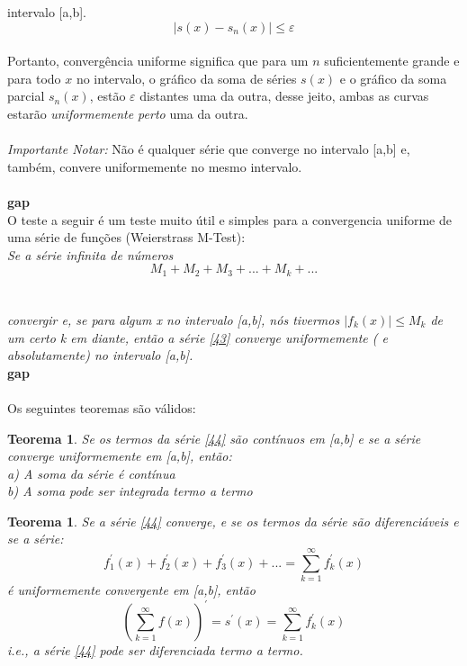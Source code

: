 intervalo [a,b].\\
\begin{equation}
    |s(x) - s_n(x)| \leq \varepsilon
\end{equation}
\\
Portanto, convergência uniforme significa que para um $n$ suficientemente 
grande e para todo $x$ no intervalo, o gráfico da soma de séries $s(x)$ e o 
gráfico da soma parcial $s_n(x)$, estão $\varepsilon$ distantes uma da outra,
desse jeito, ambas as curvas estarão \textit{uniformemente perto} uma da outra.\\
\\
\textit{Importante Notar:}
Não é qualquer série que converge no intervalo [a,b] e, também, convere uniformemente
no mesmo intervalo.\\
\\
\textbf{gap} 
\\
O teste a seguir é um teste muito útil e simples para a convergencia uniforme
de uma série de funções (Weierstrass M-Test):\\
\textit{
    Se a série infinita de números \\
    \begin{equation}
        M_1 + M_2 + M_3 + ... + M_k + ...
    \end{equation}
    \\
    \\
    convergir e, se para algum x no intervalo [a,b], nós tivermos $|f_k(x)| \leq M_k$
    de um certo k em diante, então a série \ref{43} converge uniformemente ( e 
    absolutamente) no intervalo [a,b].
} 
\\
\textbf{gap}\\
\\
Os seguintes teoremas são válidos:

\newtheorem{teo1}{Teorema}
\begin{teo1}
    Se os termos da série \ref{44} são contínuos em [a,b] e se a
    série converge uniformemente em [a,b], então:\\
    a) A soma da série é contínua\\
    b) A soma pode ser integrada termo a termo
\end{teo1}

\newtheorem{teo2}{Teorema}
\begin{teo2}
    Se a série \ref{44} converge, e se os termos da série são diferenciáveis
    e se a série:\\
    \begin{equation}
        f_1^{'}(x) + f_2^{'}(x) + f_3^{'}(x) + ... = \sum\limits_{k=1}^{\infty}f_k^{'}(x)
    \end{equation}
    é uniformemente convergente em [a,b], então\\
    \begin{equation}
        (\sum\limits_{k=1}^{\infty} f(x))^{'} = s^{'}(x) = \sum\limits_{k=1}^{\infty}f_k^{'}(x)
    \end{equation}
    i.e., a série \ref{44} pode ser diferenciada termo a termo.
\end{teo2}